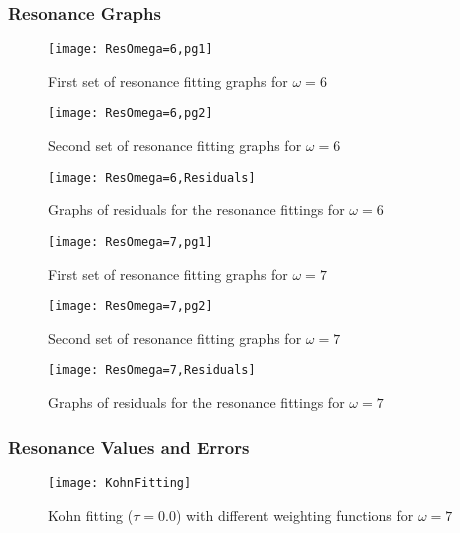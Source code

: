 \documentclass[Dissertation.tex]{subfiles}
\begin{document}
\subsubsection{Resonance Graphs}
\label{sec:ResonanceGraphs}

\begin{figure}[H]
	\centering
	\texttt{[image: ResOmega=6,pg1]}
	\caption{First set of resonance fitting graphs for $\omega = 6$}
	\label{fig:ResOmega=6,pg1}
\end{figure}

\begin{figure}[H]
	\centering
	\texttt{[image: ResOmega=6,pg2]}
	\caption{Second set of resonance fitting graphs for $\omega = 6$}
	\label{fig:ResOmega=6,pg2}
\end{figure}

\begin{figure}[H]
	\centering
	\texttt{[image: ResOmega=6,Residuals]}
	\caption{Graphs of residuals for the resonance fittings for $\omega = 6$}
	\label{fig:ResOmega=6,Residuals}
\end{figure}

\begin{figure}[H]
	\centering
	\texttt{[image: ResOmega=7,pg1]}
	\caption{First set of resonance fitting graphs for $\omega = 7$}
	\label{fig:ResOmega=7,pg1}
\end{figure}

\begin{figure}[H]
	\centering
	\texttt{[image: ResOmega=7,pg2]}
	\caption{Second set of resonance fitting graphs for $\omega = 7$}
	\label{fig:ResOmega=7,pg2}
\end{figure}

\begin{figure}[H]
	\centering
	\texttt{[image: ResOmega=7,Residuals]}
	\caption{Graphs of residuals for the resonance fittings for $\omega = 7$}
	\label{fig:ResOmega=7,Residuals}
\end{figure}


\subsubsection{Resonance Values and Errors}
\label{sec:ResonanceErrors}

\begin{figure}[H]
	\centering
	\texttt{[image: KohnFitting]}
	\caption{Kohn fitting ($\tau = 0.0$) with different weighting functions for $\omega = 7$}
	\label{fig:KohnFitting}
\end{figure}
\end{document}
